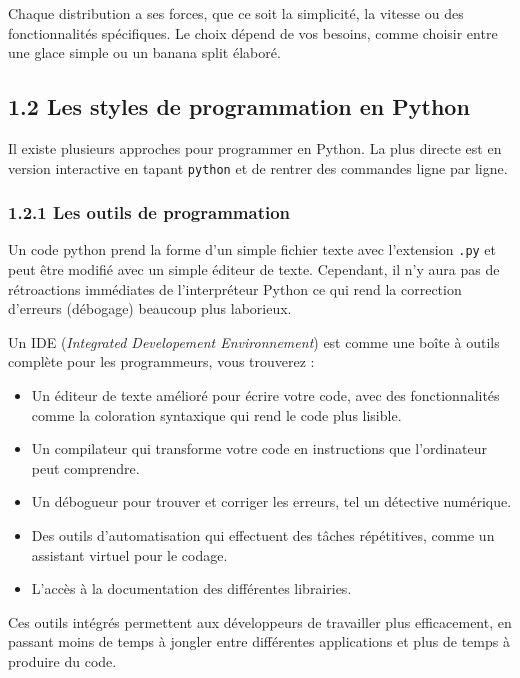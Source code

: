 \documentclass[
]{article}
\begin{document}
Chaque distribution a ses forces, que ce soit la simplicité, la vitesse
ou des fonctionnalités spécifiques. Le choix dépend de vos besoins,
comme choisir entre une glace simple ou un banana split élaboré.

\subsection{\texorpdfstring{{1.2} Les styles de programmation en
Python}{1.2 Les styles de programmation en Python}}\label{les-styles-de-programmation-en-python}

Il existe plusieurs approches pour programmer en Python. La plus directe
est en version interactive en tapant \texttt{python} et de rentrer des
commandes ligne par ligne.

\subsubsection{\texorpdfstring{{1.2.1} Les outils de
programmation}{1.2.1 Les outils de programmation}}\label{les-outils-de-programmation}

Un code python prend la forme d'un simple fichier texte avec l'extension
\texttt{.py} et peut être modifié avec un simple éditeur de texte.
Cependant, il n'y aura pas de rétroactions immédiates de l'interpréteur
Python ce qui rend la correction d'erreurs (débogage) beaucoup plus
laborieux.

Un IDE (\emph{Integrated Developement Environnement}) est comme une
boîte à outils complète pour les programmeurs, vous trouverez :

\begin{itemize}
\item
  Un éditeur de texte amélioré pour écrire votre code, avec des
  fonctionnalités comme la coloration syntaxique qui rend le code plus
  lisible.
\item
  Un compilateur qui transforme votre code en instructions que
  l'ordinateur peut comprendre.
\item
  Un débogueur pour trouver et corriger les erreurs, tel un détective
  numérique.
\item
  Des outils d'automatisation qui effectuent des tâches répétitives,
  comme un assistant virtuel pour le codage.
\item
  L'accès à la documentation des différentes librairies.
\end{itemize}

Ces outils intégrés permettent aux développeurs de travailler plus
efficacement, en passant moins de temps à jongler entre différentes
applications et plus de temps à produire du code.
\end{document}
